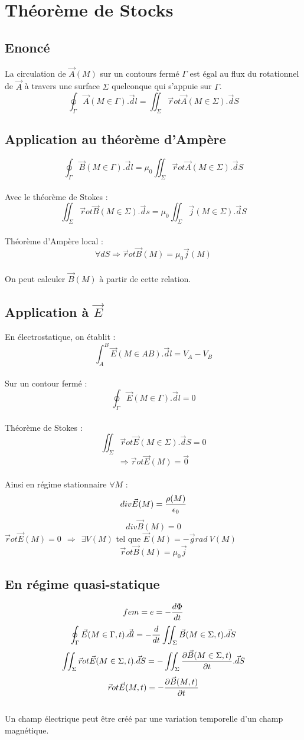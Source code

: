 \documentclass[11pt]{article}
\begin{document}
\section{Théorème de Stocks}
\subsection{Enoncé}
La circulation de $\vec A(M)$ sur un contours fermé $\Gamma$ est égal au flux du rotationnel de $\vec A$ à travers une surface $\Sigma$ quelconque qui s'appuie sur $\Gamma$.
$$\oint_\Gamma \vec A(M \in \Gamma).\vec dl = \iint_\Sigma \vec rot \vec A(M \in \Sigma).\vec dS$$
\subsection{Application au théorème d'Ampère}
$$\oint_\Gamma \vec B(M \in \Gamma).\vec dl = \mu_0 \iint_\Sigma \vec rot \vec A(M \in \Sigma).\vec dS$$ \\
Avec le théorème de Stokes : 
$$\iint_\Sigma \vec rot \vec B(M \in \Sigma). \vec ds = \mu_0 \iint_\Sigma \vec j(M \in \Sigma).\vec dS$$ \\
Théorème d'Ampère local : \\
$$ \forall dS \Rightarrow \vec rot \vec B(M) = \mu_0 \vec j(M)$$ \\
On peut calculer $\vec B(M)$ à partir de cette relation.
\subsection{Application à $\vec E$}
En électrostatique, on établit : $$\int_A^B \vec E(M \in AB). \vec dl = V_A-V_B$$ \\
Sur un contour fermé : $$ \oint_\Gamma \vec E(M \in \Gamma).\vec dl = 0 $$ \\
Théorème de Stokes : 
$$\iint_\Sigma \vec rot \vec E(M \in \Sigma).\vec dS = 0$$
$$\Rightarrow \vec rot \vec E(M) = \vec 0$$ \\
Ainsi en régime stationnaire $\forall M$ :
$$div \vec E(M) = {\rho(M) \over \epsilon_0}$$
$$div \vec B(M) = 0$$
$\vec rot \vec E(M) = 0 ~~ \Rightarrow ~~ \exists V(M)$ tel que $ \vec E(M) = - \vec grad~V(M)$
$$\vec rot \vec B(M) = \mu_0 \vec j$$
\newpage
\subsection{En régime quasi-statique}
$$fem = e = - {d \Phi \over dt}$$
$$\oint_\Gamma \vec E(M \in \Gamma, t).\vec dl = -{d \over dt} \iint_\Sigma \vec B(M \in \Sigma, t).\vec dS$$
$$\iint_\Sigma \vec rot \vec E(M \in \Sigma, t).\vec dS = - \iint_\Sigma {\partial \vec B(M \in \Sigma, t) \over \partial t}.\vec dS$$
$$\vec rot \vec E(M, t) = - {\partial \vec B(M, t) \over \partial t}$$ \\
Un champ électrique peut être créé par une variation temporelle d'un champ magnétique.
\end{document}
